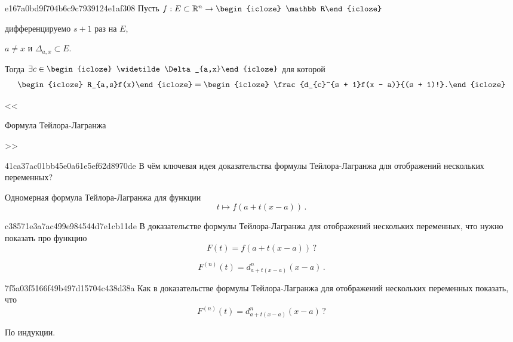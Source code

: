 \begin{note}{e167a0bd9f704b6c9c7939124e1af308}
    Пусть \({ f : E \subset \mathbb R^{n} \to \begin{icloze}{4}\mathbb R\end{icloze} }\) \begin{icloze}{6}дифференцируемо \({ s + 1 }\) раз на \({ E }\),\end{icloze} \begin{icloze}{5}\({ a \neq x }\) и \({ \Delta_{a,x} \subset E }\).\end{icloze}
    Тогда \({ \exists c \in \begin{icloze}{2}\widetilde \Delta_{a,x}\end{icloze} }\) для которой
    \[
        \begin{icloze}{3}R_{a,s}f(x)\end{icloze} = \begin{icloze}{1}\frac{d_{c}^{s + 1}f(x - a)}{(s + 1)!}.\end{icloze}
    \]

    \begin{center}
        \tiny
        <<\begin{icloze}{7}Формула Тейлора-Лагранжа\end{icloze}>>
    \end{center}
\end{note}

\begin{note}{41ca37ac01bb45e0a61e5ef62d8970de}
    В чём ключевая идея доказательства формулы Тейлора-Лагранжа для отображений нескольких переменных?

    \begin{cloze}{1}
        Одномерная формула Тейлора-Лагранжа для функции
        \[
            t \mapsto f(a + t(x - a))\,.
        \]
    \end{cloze}
\end{note}

\begin{note}{c38571e3a7ac499e984544d7e1cb11de}
    В доказательстве формулы Тейлора-Лагранжа для отображений нескольких переменных, что нужно показать про функцию
    \[
        F(t) = f(a + t(x - a))\,?
    \]

    \begin{cloze}{1}
        \[
            F^{(n)}(t) = d_{a + t(x - a)}^{n}(x - a)\,.
        \]
    \end{cloze}
\end{note}

\begin{note}{7f5a03f5166f49b497d15704c438d38a}
    Как в доказательстве формулы Тейлора-Лагранжа для отображений нескольких переменных показать, что
    \[
        F^{(n)}(t) = d_{a + t(x - a)}^{n}(x - a)\,?
    \]

    \begin{cloze}{1}
        По индукции.
    \end{cloze}
\end{note}


